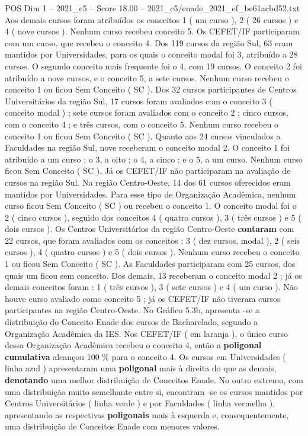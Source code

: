 \begin{textsample}{POS Dim 1 – 2021\_c5 – Score 18.00 – 2021\_c5/enade\_2021\_ef\_be61acbd52.txt}
Aos demais cursos foram atribuídos os conceitos 1 ( um curso ), 2 ( 26 cursos ) e 4 ( nove cursos ).
Nenhum curso recebeu conceito 5.
Os CEFET/IF participaram com um curso, que recebeu o conceito 4.
Dos 119 cursos da região Sul, 63 eram mantidos por Universidades, para os quais o conceito modal foi 3, atribuído a 28 cursos.
O segundo conceito mais frequente foi o 4, com 19 cursos.
O conceito 2 foi atribuído a nove cursos, e o conceito 5, a sete cursos.
Nenhum curso recebeu o conceito 1 ou ficou Sem Conceito ( SC ).
Dos 32 cursos participantes de Centros Universitários da região Sul, 17 cursos foram avaliados com o conceito 3 ( conceito modal ) ; sete cursos foram avaliados com o conceito 2 ; cinco cursos, com o conceito 4 ; e três cursos, com o conceito 5.
Nenhum curso recebeu o conceito 1 ou ficou Sem Conceito ( SC ).
Quanto aos 24 cursos vinculados a Faculdades na região Sul, nove receberam o conceito modal 2.
O conceito 1 foi atribuído a um curso ; o 3, a oito ; o 4, a cinco ; e o 5, a um curso.
Nenhum curso ficou Sem Conceito ( SC ).
Já os CEFET/IF não participaram na avaliação de cursos na região Sul.
Na região Centro-Oeste, 14 dos 61 cursos oferecidos eram mantidos por Universidades.
Para esse tipo de Organização Acadêmica, nenhum curso ficou Sem Conceito ( SC ) ou recebeu o conceito 1.
O conceito modal foi o 2 ( cinco cursos ), seguido dos conceitos 4 ( quatro cursos ), 3 ( três cursos ) e 5 ( dois cursos ).
Os Centros Universitários da região Centro-Oeste \textbf{contaram} com 22 cursos, que foram avaliados com os conceitos : 3 ( dez cursos, modal ), 2 ( seis cursos ), 4 ( quatro cursos ) e 5 ( dois cursos ).
Nenhum curso recebeu o conceito 1 ou ficou Sem Conceito ( SC ).
As Faculdades participaram com 25 cursos, dos quais um ficou sem conceito.
Dos demais, 13 receberam o conceito modal 2 ; já os demais conceitos foram : 1 ( três cursos ), 3 ( sete cursos ) e 4 ( um curso ).
Não houve curso avaliado como conceito 5 ; já os CEFET/IF não tiveram cursos participantes na região Centro-Oeste.
No Gráfico 5.3b, apresenta -se a distribuição do Conceito Enade dos cursos de Bacharelado, segundo a Organização Acadêmica da IES.
Nos CEFET/IF ( em laranja ), o único curso dessa Organização Acadêmica recebeu o conceito 4, então a \textbf{poligonal} \textbf{cumulativa} alcançou 100 \% para o conceito 4.
Os cursos em Universidades ( linha azul ) apresentaram uma \textbf{poligonal} mais à direita do que as demais, \textbf{denotando} uma melhor distribuição de Conceitos Enade.
No outro extremo, com uma distribuição muito semelhante entre si, encontram -se os cursos mantidos por Centros Universitários ( linha verde ) e por Faculdades ( linha vermelha ), apresentando as respectivas \textbf{poligonais} mais à esquerda e, consequentemente, uma distribuição de Conceitos Enade com menores valores.

\end{textsample}
